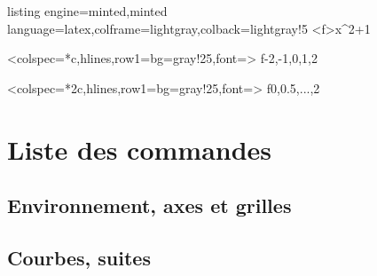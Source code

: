 \documentclass[11pt,a4paper]{ltxdoc}
\begin{document}
\begin{tcblisting}{listing engine=minted,minted language=latex,colframe=lightgray,colback=lightgray!5}
\GenererFonction<f>{x^2+1}

\ConstruireTableauValeurs%
  [Arrondi=2]%
  <colspec={*{\tdvnbvals}{c}},hlines,row{1}={bg=gray!25,font=\bfseries}>%
  {f}{-2,-1,0,1,2}

\ConstruireTableauValeurs%
  [Arrondi=2,Presentation=V]%
  <colspec={*{2}{c}},hlines,row{1}={bg=gray!25,font=\bfseries}>%
  {f}{0,0.5,...,2}
\end{tcblisting}

\newpage

\section{Liste des commandes}

\NewDocumentCommand{}

\subsection{Environnement, axes et grilles}

\begin{description}[noitemsep]
\end{description}

\subsection{Courbes, suites}
\end{document}

